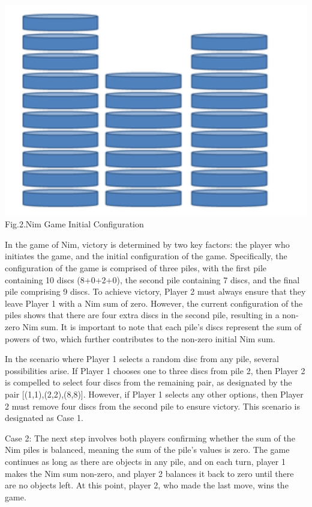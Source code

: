\documentclass[conference]{IEEEtran}
\begin{document}
\begin{center}
    \includegraphics[scale=0.58]{Nim game.png}\\
    \caption{ Fig.2.Nim Game Initial Configuration}
\end{center}

In the game of Nim, victory is determined by two key factors: the player who initiates the game, and the initial configuration of the game. Specifically, the configuration of the game is comprised of three piles, with the first pile containing 10 discs (8+0+2+0), the second pile containing 7 discs, and the final pile comprising 9 discs. To achieve victory, Player 2 must always ensure that they leave Player 1 with a Nim sum of zero. However, the current configuration of the piles shows that there are four extra discs in the second pile, resulting in a non-zero Nim sum. It is important to note that each pile's discs represent the sum of powers of two, which further contributes to the non-zero initial Nim sum.

In the scenario where Player 1 selects a random disc from any pile, several possibilities arise. If Player 1 chooses one to three discs from pile 2, then Player 2 is compelled to select four discs from the remaining pair, as designated by the pair [(1,1),(2,2),(8,8)]. However, if Player 1 selects any other options, then Player 2 must remove four discs from the second pile to ensure victory. This scenario is designated as Case 1.

Case 2: The next step involves both players confirming whether the sum of the Nim piles is balanced, meaning the sum of the pile's values is zero. The game continues as long as there are objects in any pile, and on each turn, player 1 makes the Nim sum non-zero, and player 2 balances it back to zero until there are no objects left. At this point, player 2, who made the last move, wins the game.
\end{document}
